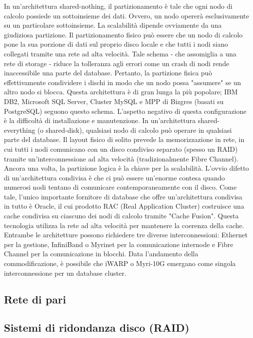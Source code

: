 In un'architettura shared-nothing, il partizionamento è tale che ogni nodo di calcolo possiede un sottoinsieme dei dati. Ovvero, un nodo operer\`{a} esclusivamente su un particolare sottoinsieme. La scalabilit\`{a} dipende ovviamente da una giudiziosa partizione. Il partizionamento fisico può essere che un nodo di calcolo pone la sua porzione di dati sul proprio disco locale e che tutti i nodi siano collegati tramite una rete ad alta velocit\`{a}. Tale schema - che assomiglia a una rete di storage - riduce la tolleranza agli errori come un crash di nodi rende inaccessibile una parte del database. Pertanto, la partizione fisica può effettivamente condividere i dischi in modo che un nodo possa "assumere" se un altro nodo si blocca.
Questa architettura è di gran lunga la più popolare; IBM DB2, Microsoft SQL Server, Cluster MySQL e MPP di Bizgres (basati su PostgreSQL) seguono questo schema. L'aspetto negativo di questa configurazione \`{e} la difficolt\`{a} di installazione e manutenzione.
In un'architettura shared-everything (o shared-disk), qualsiasi nodo di calcolo può operare in qualsiasi parte del database. Il layout fisico di solito prevede la memorizzazione in rete, in cui tutti i nodi comunicano con un disco condiviso separato (spesso un RAID) tramite un'interconnessione ad alta velocit\`{a} (tradizionalmente Fibre Channel). Ancora una volta, la partizione logica \`{e} la chiave per la scalabilit\`{a}. L'ovvio difetto di un'architettura condivisa \`{e} che ci pu\`{o} essere un'enorme contesa quando numerosi nodi tentano di comunicare contemporaneamente con il disco.
Come tale, l'unico importante fornitore di database che offre un'architettura condivisa in tutto \`{e} Oracle, il cui prodotto RAC (Real Application Cluster) costruisce una cache condivisa su ciascuno dei nodi di calcolo tramite "Cache Fusion". Questa tecnologia utilizza la rete ad alta velocit\`{a} per mantenere la coerenza della cache.
Entrambe le architetture possono richiedere tre diverse interconnessioni: Ethernet per la gestione, InfiniBand o Myrinet per la comunicazione internode e Fibre Channel per la comunicazione in blocchi. Data l'andamento della commodificazione, \`{e} possibile che iWARP o Myri-10G emergano come singola interconnessione per un database cluster.
\subsection{Rete di pari}
\subsection{Sistemi di ridondanza disco (RAID)}
